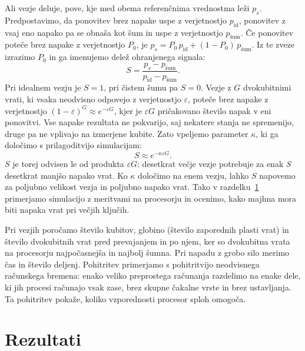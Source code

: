 Ali vezje deluje, pove, kje med obema referenčnima vrednostma leži $p_s$. Predpostavimo, da ponovitev brez napake uspe z verjetnostjo $p_\text{id}$, ponovitev z vsaj eno napako pa se obnaša kot šum in uspe z verjetnostjo $p_\text{šum}$. Če ponovitev poteče brez napake z verjetnostjo $P_0$, je $p_s = P_0\, p_\text{id} + (1 - P_0)\, p_\text{šum}$. Iz te zveze izrazimo $P_0$ in ga imenujemo delež ohranjenega signala:
\begin{equation}
S = \frac{p_s - p_\text{šum}}{p_\text{id} - p_\text{šum}}.
\end{equation}
Pri idealnem vezju je $S = 1$, pri čistem šumu pa $S = 0$. Vezje z $G$ dvokubitnimi vrati, ki vsaka neodvisno odpovejo z verjetnostjo $\varepsilon$, poteče brez napake z verjetnostjo $(1 - \varepsilon)^G \approx e^{-\varepsilon G}$, kjer je $\varepsilon G$ pričakovano število napak v eni ponovitvi. Vse napake rezultata ne pokvarijo, saj nekatere stanja ne spremenijo, druge pa ne vplivajo na izmerjene kubite. Zato vpeljemo parameter $\kappa$, ki ga določimo s prilagoditvijo simulacijam:
\begin{equation}
S \approx e^{-\kappa \varepsilon G}.
\label{g29:eq:signal}
\end{equation}
$S$ je torej odvisen le od produkta $\varepsilon G$: desetkrat večje vezje potrebuje za enak $S$ desetkrat manjšo napako vrat. Ko $\kappa$ določimo na enem vezju, lahko $S$ napovemo za poljubno velikost vezja in poljubno napako vrat. Tako v razdelku~\ref{g29:sec:rezultati} primerjamo simulacijo z meritvami na procesorju in ocenimo, kako majhna mora biti napaka vrat pri večjih ključih.

Pri vezjih poročamo število kubitov, globino (število zaporednih plasti vrat) in število dvokubitnih vrat pred prevajanjem in po njem, ker so dvokubitna vrata na procesorju najpočasnejša in najbolj šumna. Pri napadu z grobo silo merimo čas in število deljenj. Pohitritev primerjamo s pohitritvijo neodvisnega računskega bremena: enako veliko preprostega računanja razdelimo na enake dele, ki jih procesi računajo vsak zase, brez skupne čakalne vrste in brez ustavljanja. Ta pohitritev pokaže, koliko vzporednosti procesor sploh omogoča.


\section{Rezultati}
\label{g29:sec:rezultati}

